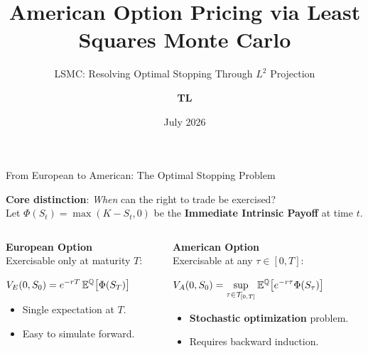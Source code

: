 \documentclass[10pt,aspectratio=169]{beamer}
\newcommand{\highlighteq}[1]{%
  \begin{center}
    \vspace{-0.1cm}
    \begin{tcolorbox}[
      colback=boxBg, colframe=mathGold, 
      boxrule=1.5pt, arc=2pt,
      top=4pt, bottom=4pt, left=4pt, right=4pt,
      width=0.95\linewidth, 
      halign=center, nobeforeafter
    ]
      $\displaystyle \fontsize{11}{14}\selectfont #1$
    \end{tcolorbox}
    \vspace{-0.1cm}
  \end{center}
}
\newcommand{\Q}{\mathbb{Q}}
\newcommand{\E}{\mathbb{E}}
\begin{document}

\title{American Option Pricing via Least Squares Monte Carlo}
\subtitle{LSMC: Resolving Optimal Stopping Through $L^2$ Projection}
\author{\textbf{TL}}
\date{July 2026}

\begin{frame}
  \titlepage
\end{frame}

\begin{frame}{From European to American: The Optimal Stopping Problem}

\textbf{Core distinction}: \textit{When} can the right to trade be exercised?
\vspace{0.1cm}
\\
\small \textcolor{gray!80}{Let $\Phi(S_t) = \max(K - S_t, 0)$ be the \textbf{Immediate Intrinsic Payoff} at time $t$.}

\vspace{0.3cm}
\begin{columns}[T] 
\begin{column}{0.48\textwidth}
\centering
\textbf{European Option} \\
\smallskip
\small Exercisable only at maturity $T$:
\highlighteq{
  V_E(0,S_0) = e^{-rT}\,\E^\Q\bigl[\Phi(S_T)\bigr]
}
\vspace{0.1cm}
\begin{itemize}
    \item Single expectation at $T$.
    \item Easy to simulate forward.
\end{itemize}
\end{column}
\begin{column}{0.48\textwidth}
\centering
\textbf{American Option} \\
\smallskip
\small Exercisable at any $\tau \in [0,T]$:
\highlighteq{
  V_A(0,S_0) = \sup_{\tau\in\mathcal{T}_{[0,T]}} \E^\Q\bigl[e^{-r\tau}\Phi(S_\tau)\bigr]
}
\vspace{0.1cm}
\begin{itemize}
    \item \textbf{Stochastic optimization} problem.
    \item Requires backward induction.
\end{itemize}
\end{column}
\end{columns}

\end{frame}
\end{document}
